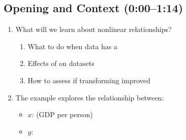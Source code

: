 \documentclass[11pt]{article}
\begin{document}
\subsection*{Opening and Context (0:00--1:14)}
\begin{enumerate}[label=\arabic*.]
\item What will we learn about nonlinear relationships?
\begin{enumerate}[label=\alph*)]
\item What to do when data has a \underline{\hspace{2in}}
\item Effects of \underline{\hspace{1.5in}} on datasets
\item How to assess if transforming improved \underline{\hspace{1.5in}}
\end{enumerate}

\item The example explores the relationship between:
\begin{itemize}
\item $x$: \underline{\hspace{3in}} (GDP per person)
\item $y$: \underline{\hspace{3in}}
\end{itemize}
\end{enumerate}
\end{document}
